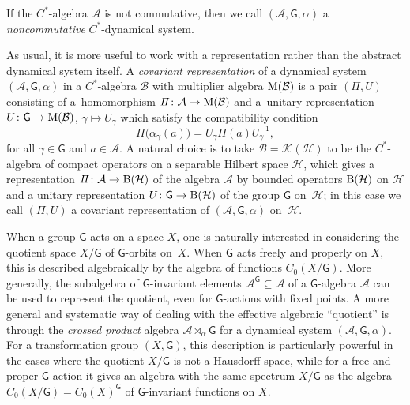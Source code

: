 \documentclass[10pt,a4paper]{amsart}
\numberwithin{equation}{section}
\newcommand{\CK}{\mathcal{K}}
\newcommand{\sfG}{\mathsf{G}}
\newcommand{\Pim}{{\mathit\Pi}}
\def\alg{{\mathcal A}}
\def\balg{{\mathcal B}}
\def\hil{{\mathcal H}}
\begin{document}
If the $C^*$-algebra $\alg$ is not commutative, then we call
$(\alg,\sfG,\alpha)$ a \emph{noncommutative} $C^*$-dynamical system.

As usual, it is more useful to work with a representation rather than the
abstract dynamical system itself. A \emph{covariant representation} of
a dynamical system $(\alg,\sfG,\alpha)$ in a $C^*$-algebra $\balg$ with
multiplier algebra ${\rm M}(\balg)$ is a
pair $(\Pim,U)$ consisting of a~homomorphism $\Pim\colon \alg\to {\rm M}(\balg)$ and a~unitary representation $U\colon \sfG\to{\rm M}(\balg)$, $\gamma\mapsto U_\gamma$ which satisfy the compatibility condition
\[
\Pim\big(\alpha_\gamma(a)\big) = U_\gamma \Pim(a) U_\gamma^{-1} ,
\]
for all $\gamma\in \sfG$ and $a\in\alg$. A natural choice is to take
$\balg=\CK(\hil)$ to be the $C^*$-algebra of compact operators on a
separable Hilbert space $\hil$, which gives a
representation $\Pim\colon \alg\to{\rm B}(\hil)$ of the algebra $\alg$ by
bounded operators ${\rm B}(\hil)$ on $\hil$ and a unitary representation
$U\colon \sfG\to{\rm B}(\hil)$ of the group $\sfG$ on~$\hil$; in this case
we call $(\Pim,U)$ a covariant representation of $(\alg,\sfG,\alpha)$ on~$\hil$.

When a group $\sfG$ acts on a space $X$, one is naturally interested
in considering the
quotient space $X/\sfG$ of $\sfG$-orbits on~$X$. When $\sfG$ acts
freely and properly on
$X$, this is described algebraically by the algebra of functions
$C_0(X/\sfG)$. More generally, the subalgebra of $\sfG$-invariant elements
$\alg^\sfG\subseteq\alg$ of a $\sfG$-algebra $\alg$ can be used to represent the quotient, even for
$\sfG$-actions with fixed points. A more general and systematic way of
dealing with the effective algebraic ``quotient'' is through the
\emph{crossed product} algebra $\alg\rtimes_\alpha \sfG$ for a dynamical
system $(\alg,\sfG,\alpha)$. For a transformation group $(X,\sfG)$,
this description is particularly powerful in the cases where the
quotient $X/\sfG$ is not a Hausdorff space, while for a free and proper
$\sfG$-action it gives an algebra with the same spectrum $X/\sfG$
as the algebra $C_0(X/\sfG)=C_0(X)^\sfG$ of
$\sfG$-invariant functions on $X$.
\end{document}
